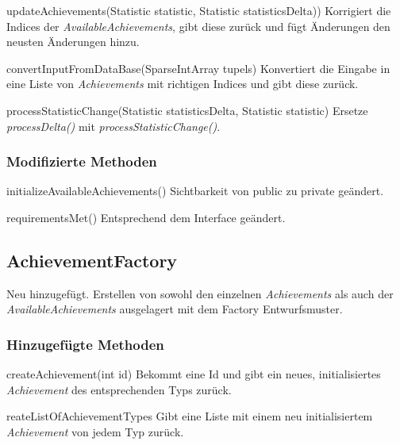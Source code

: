 \begin{description}
	\item{updateAchievements(Statistic statistic, Statistic statisticsDelta))}
	Korrigiert die Indices der \emph{AvailableAchievements}, gibt diese zurück und fügt Änderungen den neusten Änderungen hinzu.	
	
	\item{convertInputFromDataBase(SparseIntArray tupels)}
	Konvertiert die Eingabe in eine Liste von \emph{Achievements} mit richtigen Indices und gibt diese zurück.

	\item{processStatisticChange(Statistic statisticsDelta, Statistic statistic)}
	Ersetze \emph{processDelta()} mit \emph{processStatisticChange()}.
	
\end{description}



\subsubsection{Modifizierte Methoden}

\begin{description}
	\item{initializeAvailableAchievements()}
	Sichtbarkeit von public zu private geändert.
	
	\item{requirementsMet()}
	Entsprechend dem Interface geändert.	
\end{description}



\subsection{AchievementFactory}
Neu hinzugefügt.
Erstellen von sowohl den einzelnen \emph{Achievements} als auch der \emph{AvailableAchievements} ausgelagert mit dem Factory Entwurfsmuster.

\subsubsection{Hinzugefügte Methoden}

\begin{description}
	\item{createAchievement(int id)}
	Bekommt eine Id und gibt ein neues, initialisiertes \emph{Achievement} des entsprechenden Typs zurück.

	\item{reateListOfAchievementTypes}
	Gibt eine Liste mit einem neu initialisiertem \emph{Achievement} von jedem Typ zurück.

\end{description}


